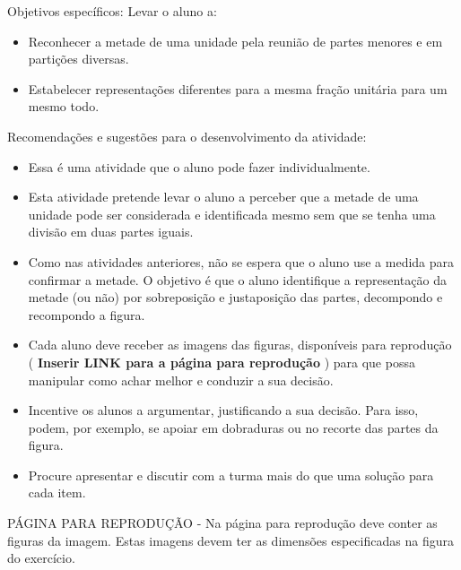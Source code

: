 \documentclass[a4paper,12pt,twoside]{book}
\begin{document}
\begin{professor*}[breakable]{}{}  
  Objetivos específicos: Levar o aluno a:  
\begin{itemize} %
    \item       Reconhecer a metade de uma unidade pela reunião de partes menores e em partições diversas. 
    \item       Estabelecer representações diferentes para a mesma fração unitária para um mesmo todo.
\end{itemize} %
  
  
  Recomendações e sugestões para o desenvolvimento da atividade:  
\begin{itemize} %
    \item       Essa é uma atividade que o aluno pode fazer individualmente.
    \item       Esta atividade pretende levar o aluno a perceber que a metade de uma unidade pode ser considerada e identificada mesmo sem que se tenha uma divisão em duas partes iguais. 
    \item       Como nas atividades anteriores, não se espera que o aluno use a medida para confirmar a metade. O objetivo é que o aluno identifique a representação da metade (ou não) por sobreposição e justaposição das partes, decompondo e recompondo a figura.
    \item       Cada aluno deve receber as imagens das figuras, disponíveis para reprodução (      {\bf Inserir LINK para a página para reprodução}      ) para que possa manipular como achar melhor e conduzir a sua decisão. 
    \item       Incentive os alunos a argumentar, justificando a sua decisão. Para isso, podem, por exemplo, se apoiar em dobraduras ou no recorte das partes da figura.
    \item       Procure apresentar e discutir com a turma mais do que uma solução para cada item.   
\end{itemize} %
  
  
  \begin{imagem*}[breakable]{}{}         
    \begin{nota*}[breakable]{}{}       PÁGINA PARA REPRODUÇÃO - Na página para reprodução deve conter as figuras da imagem. Estas imagens devem ter as dimensões especificadas na figura do exercício.      
    \end{nota*}    
  \end{imagem*}  
\end{professor*}
\end{document}
